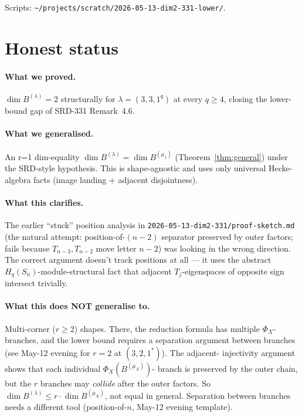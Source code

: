\documentclass[11pt]{article}
\theoremstyle{definition}
\begin{document}
Scripts: \texttt{\textasciitilde/projects/scratch/2026-05-13-dim2-331-lower/}.

\section{Honest status}\label{sec:honest}

\paragraph{What we proved.} $\dim B^{(\lambda)} = 2$ structurally for
$\lambda = (3, 3, 1^q)$ at every $q \ge 4$, closing the lower-bound
gap of SRD-331 Remark~4.6.

\paragraph{What we generalised.} An r=1 dim-equality
$\dim B^{(\lambda)} = \dim B^{(\mu_1)}$
(Theorem~\ref{thm:general}) under the SRD-style hypothesis. This is
shape-agnostic and uses only universal Hecke-algebra facts (image
landing + adjacent disjointness).

\paragraph{What this clarifies.} The earlier ``stuck'' position
analysis in \texttt{2026-05-13-dim2-331/proof-sketch.md} (the natural
attempt: position-of-$(n-2)$ separator preserved by outer factors;
fails because $T_{n-3}, T_{n-2}$ move letter $n-2$) was looking in the
wrong direction. The correct argument doesn't track positions at all
--- it uses the abstract $H_q(S_n)$-module-structural fact that
adjacent $T_j$-eigenspaces of opposite sign intersect trivially.

\paragraph{What this does NOT generalise to.} Multi-corner ($r \ge 2$)
shapes. There, the reduction formula has multiple $\Phi_X$-branches,
and the lower bound requires a separation argument between branches
(see May-12 evening for $r = 2$ at $(3, 2, 1^*)$). The adjacent-
injectivity argument shows that each individual $\Phi_X(B^{(\mu_X)})$-
branch is preserved by the outer chain, but the $r$ branches may
\emph{collide} after the outer factors. So $\dim B^{(\lambda)} \le r
\cdot \dim B^{(\mu_X)}$, not equal in general. Separation between
branches needs a different tool (position-of-$n$, May-12 evening
template).
\end{document}
